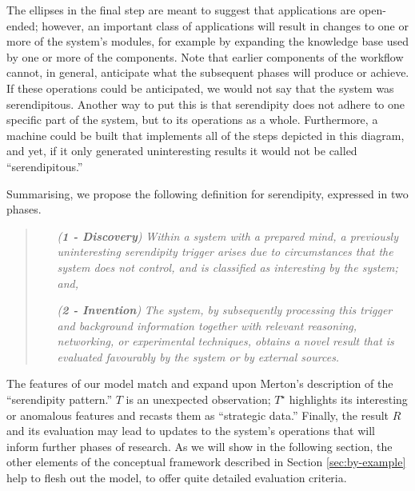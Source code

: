 The ellipses in the final step are meant to suggest that applications
are open-ended; however, an important class of applications will
result in changes to one or more of the system's modules, for example
by expanding the knowledge base used by one or more of the components.
Note that earlier components of the workflow cannot, in general,
anticipate what the subsequent phases will produce or achieve.  If
these operations could be anticipated, we would not say that the
system was serendipitous.  Another way to put this is that serendipity
does not adhere to one specific part of the system, but to its
operations as a whole.  Furthermore, a machine could be built that
implements all of the steps depicted in this diagram, and yet, if it
only generated uninteresting results it would not be called
``serendipitous.''

Summarising, we propose the following definition for serendipity,
expressed in two phases.

\begin{quote}
\begin{enumerate}[itemsep=2pt,labelwidth=9em,leftmargin=7em,rightmargin=2em]
\item[\emph{(\textbf{1 - Discovery})}] \emph{Within a system with a prepared mind, a previously uninteresting serendipity trigger arises due to circumstances that the system does not control, and is classified as interesting by the system; and,}
\item[\emph{(\textbf{2 - Invention})}] \emph{The system, by subsequently processing this trigger and background information together with relevant reasoning, networking, or experimental techniques, obtains a novel result that is evaluated favourably by the system or by external sources.}
\end{enumerate}
\end{quote}

The features of our model match and expand upon Merton's
\citeyear{merton1948bearing} description of the ``serendipity
pattern.'' $T$ is an unexpected observation; $T^\star$ highlights its
interesting or anomalous features and recasts them as ``strategic
data.''  Finally, the result $R$ and its evaluation may lead to
updates to the system's operations that will inform further phases of
research.  As we will show in the following section, the other
elements of the conceptual framework described in Section
\ref{sec:by-example} help to flesh out the model, to offer quite
detailed evaluation criteria.
